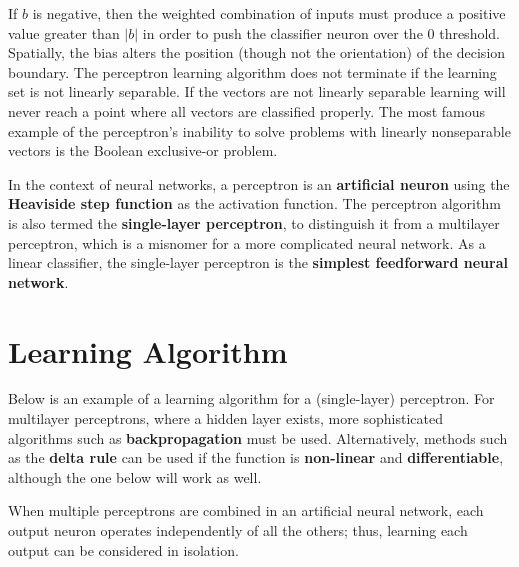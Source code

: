 If $b$ is negative, then the weighted combination of inputs must produce a positive value greater than $|b|$ in order to push the classifier neuron over the 0 threshold. Spatially, the bias alters the position (though not the orientation) of the decision boundary. The perceptron learning algorithm does not terminate if the learning set is not linearly separable. If the vectors are not linearly separable learning will never reach a point where all vectors are classified properly. The most famous example of the perceptron's inability to solve problems with linearly nonseparable vectors is the Boolean exclusive-or problem.

In the context of neural networks, a perceptron is an \textbf{artificial neuron} using the \textbf{Heaviside step function} as the activation function. The perceptron algorithm is also termed the \textbf{single-layer perceptron}, to distinguish it from a multilayer perceptron, which is a misnomer for a more complicated neural network. As a linear classifier, the single-layer perceptron is the \textbf{simplest feedforward neural network}.

\section{Learning Algorithm}
Below is an example of a learning algorithm for a (single-layer) perceptron. For multilayer perceptrons, where a hidden layer exists, more sophisticated algorithms such as \textbf{backpropagation} must be used. Alternatively, methods such as the \textbf{delta rule} can be used if the function is \textbf{non-linear} and \textbf{differentiable}, although the one below will work as well.

When multiple perceptrons are combined in an artificial neural network, each output neuron operates independently of all the others; thus, learning each output can be considered in isolation.

